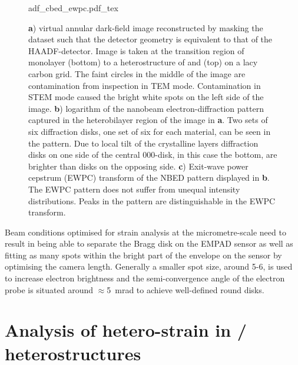 \begin{figure}
	\centering
	\def\svgwidth{0.9\linewidth}
	{adf_cbed_ewpc.pdf_tex}
	\caption{\textbf{a}) virtual annular dark-field image reconstructed by masking the dataset such that the detector geometry is equivalent to that of the HAADF-detector. Image is taken at the transition region of monolayer  (bottom) to a heterostructure of  and  (top) on a lacy carbon grid. The faint circles in the middle of the image are contamination from inspection in TEM mode. Contamination in STEM mode caused the bright white spots on the left side of the image. \textbf{b}) logarithm of the nanobeam electron-diffraction pattern captured in the heterobilayer region of the image in \textbf{a}. Two sets of six diffraction disks, one set of six for each material, can be seen in the pattern. Due to local tilt of the crystalline layers diffraction disks on one side of the central $000$-disk, in this case the bottom, are brighter than disks on the opposing side. \textbf{c}) Exit-wave power cepstrum (EWPC) transform of the NBED pattern displayed in \textbf{b}. The EWPC pattern does not suffer from unequal intensity distributions. Peaks in the pattern are distinguishable in the EWPC transform.}
	\label{fig:adf_nbed_ewpc}
\end{figure}

Beam conditions optimised for strain analysis at the micrometre-scale need to result in being able to separate the Bragg disk on the EMPAD sensor as well as fitting as many spots within the bright part of the envelope on the sensor by optimising the camera length. Generally a smaller spot size, around 5-6, is used to increase electron brightness and the semi-convergence angle of the electron probe is situated around $\approx$\SI{5}{\milli\radian} to achieve well-defined round disks. 


\section{Analysis of hetero-strain in / heterostructures}

